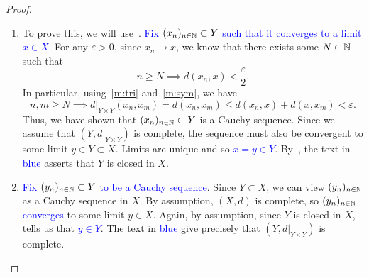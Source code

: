 \begin{proof}
\begin{enumerate}
	\item To prove this, we will use~. \textcolor{blue}{Fix $(x_n)_{n\in\mathbb{N}}\subset Y$ such that it converges to a limit $x\in X$.} For any $\varepsilon>0$, since $x_n\to x$, we know that there exists some $N\in\mathbb{N}$ such that
	\[
	n\ge N \implies d(x_n,x)<\frac{\varepsilon}{2}.
	\]
	In particular, using~\ref{m:tri} and~\ref{m:sym}, we have
	\[
	n,m\ge N \implies d|_{Y\times Y}(x_n,x_m) = d(x_n,x_m) \le d(x_n,x) + d(x,x_m) < \varepsilon.
	\]
	Thus, we have shown that $(x_n)_{n\in\mathbb{N}}\subset Y$ is a Cauchy sequence. Since we assume that $(Y,d|_{Y\times Y})$ is complete, the sequence must also be convergent to some limit $y\in Y\subset X$. Limits are unique and so \textcolor{blue}{$x= y\in Y$}. By~, the text in \textcolor{blue}{blue} asserts that $Y$ is closed in $X$.
	\item \textcolor{blue}{Fix $(y_n)_{n\in\mathbb{N}}\subset Y$ to be a Cauchy sequence}. Since $Y\subset X$, we can view $(y_n)_{n\in\mathbb{N}}$ as a Cauchy sequence in $X$. By assumption, $(X,d)$ is complete, so \textcolor{blue}{$(y_n)_{n\in\mathbb{N}}$ converges} to some limit $y\in X$. Again, by assumption, since $Y$ is closed in $X$,  tells us that \textcolor{blue}{$y\in Y$}. The text in \textcolor{blue}{blue} give precisely that $(Y,d|_{Y\times Y})$ is complete.
\end{enumerate}
\end{proof}
